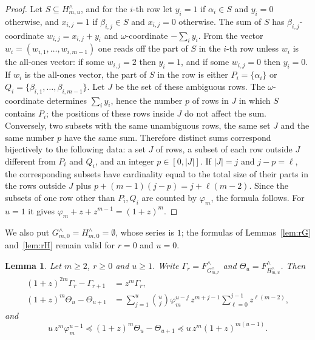 \documentclass[11pt]{amsart}
\newtheorem{lemma}[theorem]{Lemma}
\theoremstyle{definition}
\theoremstyle{remark}
\numberwithin{equation}{section}
\newcommand{\Fr}{F^{\wedge}}
\newcommand{\cle}{\preceq}
\begin{document}
\begin{proof}
Let $S\subseteq H^\wedge_{m,u}$, and for the $i$-th row let $y_i=1$ if $\alpha_i\in S$ and $y_i=0$ otherwise, and $x_{i,j}=1$ if $\beta_{i,j}\in S$ and $x_{i,j}=0$ otherwise. The sum of $S$ has $\beta_{i,j}$-coordinate $w_{i,j}=x_{i,j}+y_i$ and $\omega$-coordinate $-\sum_iy_i$. From the vector $w_i=(w_{i,1},\dots,w_{i,m-1})$ one reads off the part of $S$ in the $i$-th row unless $w_i$ is the all-ones vector: if some $w_{i,j}=2$ then $y_i=1$, and if some $w_{i,j}=0$ then $y_i=0$. If $w_i$ is the all-ones vector, the part of $S$ in the row is either $P_i=\{\alpha_i\}$ or $Q_i=\{\beta_{i,1},\dots,\beta_{i,m-1}\}$. Let $J$ be the set of these ambiguous rows. The $\omega$-coordinate determines $\sum_iy_i$, hence the number $p$ of rows in $J$ in which $S$ contains $P_i$; the positions of these rows inside $J$ do not affect the sum. Conversely, two subsets with the same unambiguous rows, the same set $J$ and the same number $p$ have the same sum. Therefore distinct sums correspond bijectively to the following data: a set $J$ of rows, a subset of each row outside $J$ different from $P_i$ and $Q_i$, and an integer $p\in[0,|J|]$. If $|J|=j$ and $j-p=\ell$, the corresponding subsets have cardinality equal to the total size of their parts in the rows outside $J$ plus $p+(m-1)(j-p)=j+\ell(m-2)$. Since the subsets of one row other than $P_i,Q_i$ are counted by $\varphi_m$, the formula follows. For $u=1$ it gives $\varphi_m+z+z^{m-1}=(1+z)^m$.
\end{proof}

We also put $G^\wedge_{m,0}=H^\wedge_{m,0}=\emptyset$, whose series is $1$; the formulas of Lemmas~\ref{lem:rG} and~\ref{lem:rH} remain valid for $r=0$ and $u=0$.

\begin{lemma}\label{lem:rdiff}
Let $m\ge 2$, $r\ge 0$ and $u\ge 1$. Write $\Gamma_r=\Fr_{G^\wedge_{m,r}}$ and $\Theta_u=\Fr_{H^\wedge_{m,u}}$. Then
\begin{align}
(1+z)^{2m}\Gamma_r-\Gamma_{r+1}&=z^m\Gamma_r,\label{eq:rGdiff}\\
(1+z)^m\Theta_u-\Theta_{u+1}&=\sum_{j=1}^u\binom uj\varphi_m^{u-j}\,z^{m+j-1}\sum_{\ell=0}^{j-1}z^{\ell(m-2)},\label{eq:rHdiff}
\end{align}
and
\begin{equation}\label{eq:rHbounds}
u\,z^m\varphi_m^{u-1}\cle(1+z)^m\Theta_u-\Theta_{u+1}\cle u\,z^m(1+z)^{m(u-1)}.
\end{equation}
\end{lemma}
\end{document}
